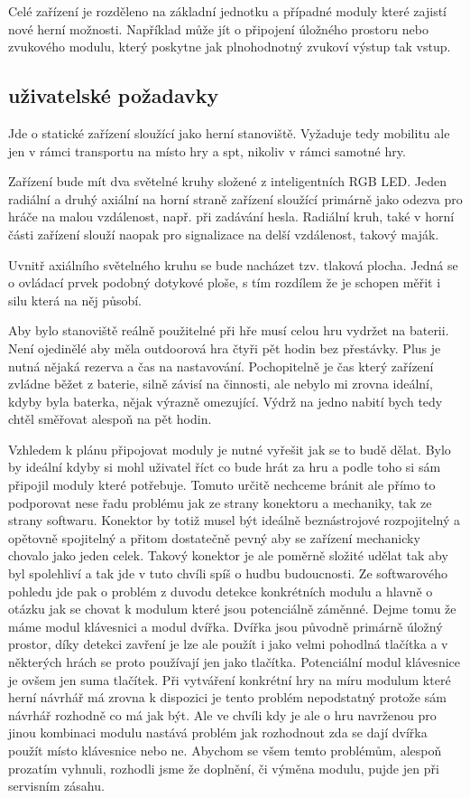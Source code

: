 Celé zařízení je rozděleno na základní jednotku a případné moduly které zajistí nové herní možnosti.
Například může jít o připojení úložného prostoru nebo zvukového modulu, který poskytne jak plnohodnotný zvukoví výstup tak vstup.

\subsection{uživatelské požadavky}
Jde o statické zařízení sloužící jako herní stanoviště.
Vyžaduje tedy mobilitu ale jen v rámci transportu na místo hry a spt, nikoliv v rámci samotné hry.

Zařízení bude mít dva světelné kruhy složené z inteligentních RGB LED.
Jeden radiální a druhý axiální na horní straně zařízení sloužící primárně jako odezva pro hráče na malou vzdálenost, např. při zadávání hesla.
Radiální kruh, také v horní části zařízení slouží naopak pro signalizace na delší vzdálenost, takový maják.

Uvnitř axiálního světelného kruhu se bude nacházet tzv. tlaková plocha.
Jedná se o ovládací prvek podobný dotykové ploše, s tím rozdílem že je schopen měřit i silu která na něj působí.

Aby bylo stanoviště reálně použitelné při hře musí celou hru vydržet na baterii.
Není ojedinělé aby měla outdoorová hra čtyři pět hodin bez přestávky.
Plus je nutná nějaká rezerva a čas na nastavování.
Pochopitelně je čas který zařízení zvládne běžet z baterie, silně závisí na činnosti, ale nebylo mi zrovna ideální, kdyby byla baterka, nějak výrazně omezující.
Výdrž na jedno nabití bych tedy chtěl směřovat alespoň na pět hodin.

Vzhledem k plánu připojovat moduly je nutné vyřešit jak se to budě dělat.
Bylo by ideální kdyby si mohl uživatel říct co bude hrát za hru a podle toho si sám připojil moduly které potřebuje.
Tomuto určitě nechceme bránit ale přímo to podporovat nese řadu problému jak ze strany konektoru a mechaniky, tak ze strany softwaru.
Konektor by totiž musel být ideálně beznástrojové rozpojitelný a opětovně spojitelný a přitom dostatečně pevný aby se zařízení mechanicky chovalo jako jeden celek.
Takový konektor je ale poměrně složité udělat tak aby byl spolehliví a tak jde v tuto chvíli spíš o hudbu budoucnosti.
Ze softwarového pohledu jde pak o problém z duvodu detekce konkrétních modulu a hlavně o otázku jak se chovat k modulum které jsou potenciálně záměnné.
Dejme tomu že máme modul klávesnici a modul dvířka.
Dvířka jsou původně primárně úložný prostor, díky detekci zavření je lze ale použít i jako velmi pohodlná tlačítka a v některých hrách se proto používají jen jako tlačítka.
Potenciální modul klávesnice je ovšem jen suma tlačítek.
Při vytváření konkrétní hry na míru modulum které herní návrhář má zrovna k dispozici je tento problém nepodstatný protože sám návrhář rozhodně co má jak být.
Ale ve chvíli kdy je ale o hru navrženou pro jinou kombinaci modulu nastává problém jak rozhodnout zda se dají dvířka použít místo klávesnice nebo ne.
Abychom se všem temto problémům, alespoň prozatím vyhnuli, rozhodli jsme že doplnění, či výměna modulu, pujde jen při servisním zásahu.

